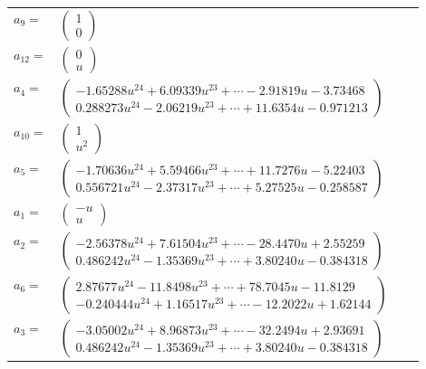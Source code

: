 \documentclass[1p]{elsarticle_modified}
\theoremstyle{definition}
\begin{document}
\begin{tabular}{m{7pt} m{180pt} m{7pt} m{180pt} }
\flushright $a_{9}=$&$\begin{pmatrix}1\\0\end{pmatrix}$ \\
\flushright $a_{12}=$&$\begin{pmatrix}0\\u\end{pmatrix}$ \\
\flushright $a_{4}=$&$\begin{pmatrix}-1.65288 u^{24}+6.09339 u^{23}+\cdots-2.91819 u-3.73468\\0.288273 u^{24}-2.06219 u^{23}+\cdots+11.6354 u-0.971213\end{pmatrix}$ \\
\flushright $a_{10}=$&$\begin{pmatrix}1\\u^2\end{pmatrix}$ \\
\flushright $a_{5}=$&$\begin{pmatrix}-1.70636 u^{24}+5.59466 u^{23}+\cdots+11.7276 u-5.22403\\0.556721 u^{24}-2.37317 u^{23}+\cdots+5.27525 u-0.258587\end{pmatrix}$ \\
\flushright $a_{1}=$&$\begin{pmatrix}- u\\u\end{pmatrix}$ \\
\flushright $a_{2}=$&$\begin{pmatrix}-2.56378 u^{24}+7.61504 u^{23}+\cdots-28.4470 u+2.55259\\0.486242 u^{24}-1.35369 u^{23}+\cdots+3.80240 u-0.384318\end{pmatrix}$ \\
\flushright $a_{6}=$&$\begin{pmatrix}2.87677 u^{24}-11.8498 u^{23}+\cdots+78.7045 u-11.8129\\-0.240444 u^{24}+1.16517 u^{23}+\cdots-12.2022 u+1.62144\end{pmatrix}$ \\
\flushright $a_{3}=$&$\begin{pmatrix}-3.05002 u^{24}+8.96873 u^{23}+\cdots-32.2494 u+2.93691\\0.486242 u^{24}-1.35369 u^{23}+\cdots+3.80240 u-0.384318\end{pmatrix}$ \\

\end{tabular}
\end{document}
